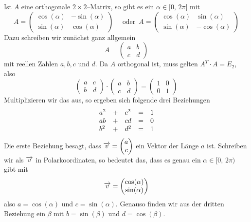 \begin{beispiel}\label{lin_alg_ortho_dreh} 
Ist $A$ eine orthogonale $2 \times 2$--Matrix, so gibt es ein $\alpha \in [0, \, 2 \pi[$ mit
  	$$ A = \left( \begin{matrix} \cos(\alpha) & -\sin(\alpha) \\ \sin(\alpha) & \cos(\alpha) \end{matrix} \right) 
  	\quad \textrm{ oder } \, 
  	A = \left( \begin{matrix} \cos(\alpha) & \sin(\alpha) \\ \sin(\alpha) & -\cos(\alpha) \end{matrix} \right) $$
Dazu schreiben wir zunächst ganz allgemein 
  	$$ A = \left( \begin{matrix} a & b  \\ c & d \end{matrix} \right) $$
mit reellen Zahlen $a, b, c$ und $d$. Da $A$ orthogonal ist, muss gelten $A^T \cdot A = E_2$, also 
  	$$ \left( \begin{matrix} a & c  \\ b & d \end{matrix} \right) \cdot 
  	\left( \begin{matrix} a & b  \\ c & d \end{matrix} \right) = 
  	\left( \begin{matrix} 1 & 0  \\ 0 & 1 \end{matrix} \right) $$
Multiplizieren wir das aus, so ergeben sich folgende drei Beziehungen
  	$$ \begin{array} {l c l c l}
  	a^2 & + & c^2 & = & 1 \\
  	ab & + & cd & = & 0 \\
  	b^2 & + & d^2 & = & 1 
  	\end{array} $$
Die erste Beziehung besagt, dass $\overrightarrow{v} = \left( \begin{matrix} a  \\ c \end{matrix} \right)$ ein 
Vektor der Länge $a$ ist. Schreiben wir als $\overrightarrow{v}$ in Polarkoordinaten, so bedeutet das, dass 
es genau ein $\alpha \in [0, \, 2\pi)$ gibt mit
  	$$ \overrightarrow{v} = \left( \begin{matrix} \cos(\alpha) \\ \sin(\alpha) \end{matrix} \right) $$
also $a = \cos(\alpha)$ und $c = \sin(\alpha)$. Genauso finden wir aus der dritten Beziehung ein $\beta$ mit 
$b = \sin(\beta)$ und $d = \cos(\beta)$.


\end{beispiel}
